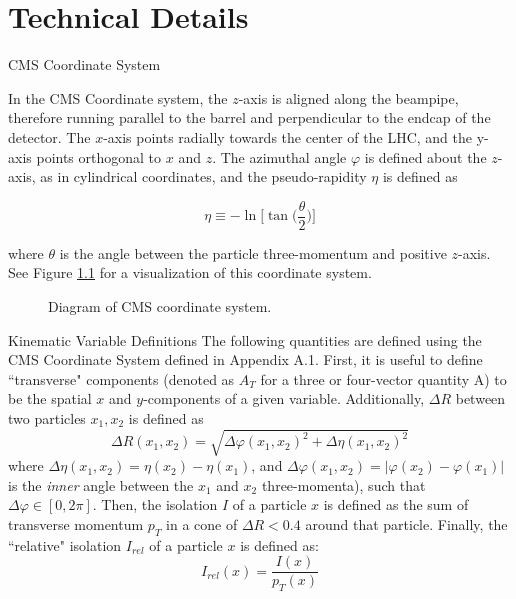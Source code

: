 \chapter{Technical Details}
\begin{section}{CMS Coordinate System}

In the CMS Coordinate system, the $z$-axis is aligned along the beampipe, therefore running parallel to the barrel and perpendicular to the endcap of the detector. The $x$-axis points radially towards the center of the LHC, and the y-axis points orthogonal to $x$ and $z$. The azimuthal angle $\varphi$ is defined about the $z$-axis, as in cylindrical coordinates, and the pseudo-rapidity $\eta$ is defined as

\begin{equation}
    \eta \equiv -\ln{\bigg[ \tan{\bigg( \frac{\theta}{2} \bigg)} \bigg]}
\end{equation}

\noindent where $\theta$ is the angle between the particle three-momentum and positive $z$-axis. See Figure \ref{fig:cms-coords} for a visualization of this coordinate system.

\begin{figure}[htb]
\begin{center}

\end{center}
\caption{Diagram of CMS coordinate system.}
\label{fig:cms-coords}
\end{figure}

\end{section}

\begin{section}{Kinematic Variable Definitions}
The following quantities are defined using the CMS Coordinate System defined in Appendix A.1. First, it is useful to define ``transverse" components (denoted as $A_{T}$ for a three or four-vector quantity A) to be the spatial $x$ and $y$-components of a given variable. Additionally, $\Delta R$ between two particles $x_1, x_2$ is defined as
\begin{equation}
    \Delta R(x_1, x_2) = \sqrt{\Delta\varphi(x_1, x_2)^{2}+\Delta\eta(x_1, x_2)^{2}}
\end{equation}
\noindent where $\Delta\eta(x_1, x_2) = \eta(x_2)-\eta(x_1)$, and $\Delta\varphi(x_1, x_2) = |\varphi(x_2) - \varphi(x_1)|$ is the \textit{inner} angle between the $x_1$ and $x_2$ three-momenta), such that $\Delta\varphi \in [0, 2\pi]$. Then, the isolation $I$ of a particle $x$ is defined as the sum of transverse momentum $p_{T}$ in a cone of $\Delta R < 0.4$ around that particle. Finally, the ``relative" isolation $I_{rel}$ of a particle $x$ is defined as:
\begin{equation}
    I_{rel}(x) = \frac{I(x)}{p_{T}(x)}
\end{equation}
\end{section}

